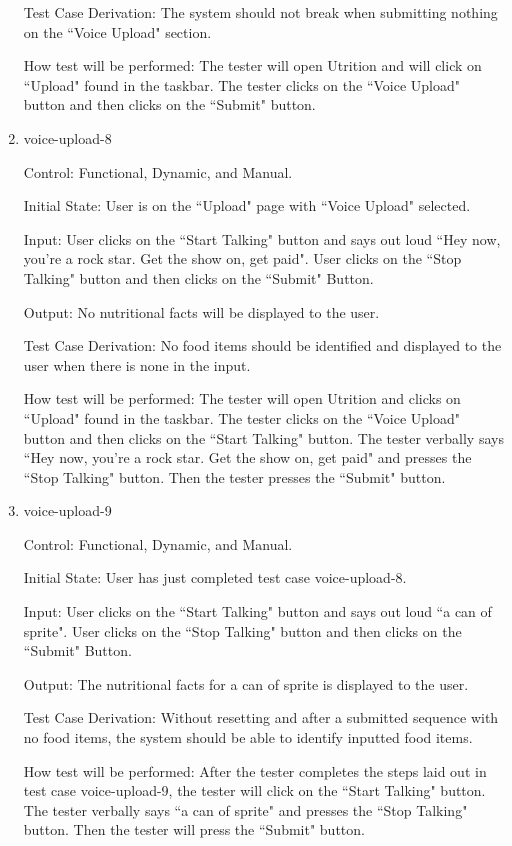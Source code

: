 \documentclass[12pt, titlepage]{article}
\begin{document}
\begin{enumerate}
	Test Case Derivation: The system should not break when submitting nothing on the ``Voice Upload" section.
	
	How test will be performed: The tester will open Utrition and will click on ``Upload" found in the taskbar. The tester clicks on the ``Voice Upload" button and then clicks on the ``Submit" button.
	
	\item{voice-upload-8\\}
	
	Control: Functional, Dynamic, and Manual.
	
	Initial State: User is on the ``Upload" page with ``Voice Upload" selected.
	
	Input: User clicks on the ``Start Talking" button and says out loud ``Hey now, you're a rock star. Get the show on, get paid". User clicks on the ``Stop Talking" button and then clicks on the ``Submit" Button.
	
	Output: No nutritional facts will be displayed to the user.
	
	Test Case Derivation: No food items should be identified and displayed to the user when there is none in the input.
	
	How test will be performed: The tester will open Utrition and clicks on ``Upload" found in the taskbar. The tester clicks on the ``Voice Upload" button and then clicks on the ``Start Talking" button. The tester verbally says ``Hey now, you're a rock star. Get the show on, get paid" and presses the ``Stop Talking" button. Then the tester presses the ``Submit" button.
	
	\item{voice-upload-9\\}
	
	Control: Functional, Dynamic, and Manual.
	
	Initial State: User has just completed test case voice-upload-8.
	
	Input: User clicks on the ``Start Talking" button and says out loud ``a can of sprite". User clicks on the ``Stop Talking" button and then clicks on the ``Submit" Button.
	
	Output: The nutritional facts for a can of sprite is displayed to the user.
	
	Test Case Derivation: Without resetting and after a submitted sequence with no food items, the system should be able to identify inputted food items.
	
	How test will be performed: After the tester completes the steps laid out in test case voice-upload-9, the tester will click on the ``Start Talking" button. The tester verbally says ``a can of sprite" and presses the ``Stop Talking" button. Then the tester will press the ``Submit" button.
	

\end{enumerate}
\end{document}
